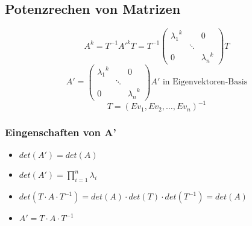 		\begin{minipage}{0.5\textwidth}
			\subsection{Potenzrechen von Matrizen}
			\begin{equation*}
				A^k = T^{-1}{A'}^kT = T^{-1}\left(\begin{array}{ccc}
					{\lambda_1}^k & & 0\\
					& \ddots & \\
					0 & & {\lambda_n}^k
				\end{array}\right) T
			\end{equation*}
			\begin{equation*}
				A' = \left(\begin{array}{ccc}
					{\lambda_1}^k & & 0\\
					& \ddots & \\
					0 & & {\lambda_n}^k
				\end{array}\right) 
				A' \text{ in Eigenvektoren-Basis}
			\end{equation*}
			\begin{equation*}
				T = (Ev_1, Ev_2, \ldots, Ev_n)^{-1}
			\end{equation*}
		\end{minipage}
		\begin{minipage}{0.5\textwidth}
			\subsubsection{Eingenschaften von A'}
			\begin{itemize}
				\item $det(A') = det(A)$
				\item $det(A') = \prod_{i=1}^{n} \lambda_i$
				\item $det(T \cdot A \cdot T^{-1}) = det(A) \cdot det(T) \cdot det(T^{-1}) = det(A)$
				\item $A'=T \cdot A \cdot T^{-1}$
			\end{itemize}
		\end{minipage}

